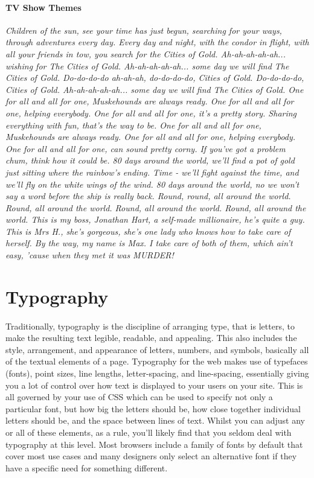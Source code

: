 \paragraph{TV Show Themes} {\emph{ Children of the sun, see your time has just begun, searching for your ways, through adventures every day. Every day and night, with the condor in flight, with all your friends in tow, you search for the Cities of Gold. Ah-ah-ah-ah-ah... wishing for The Cities of Gold. Ah-ah-ah-ah-ah... some day we will find The Cities of Gold. Do-do-do-do ah-ah-ah, do-do-do-do, Cities of Gold. Do-do-do-do, Cities of Gold. Ah-ah-ah-ah-ah... some day we will find The Cities of Gold. One for all and all for one, Muskehounds are always ready. One for all and all for one, helping everybody. One for all and all for one, it's a pretty story. Sharing everything with fun, that's the way to be. One for all and all for one, Muskehounds are always ready. One for all and all for one, helping everybody. One for all and all for one, can sound pretty corny. If you've got a problem chum, think how it could be. 80 days around the world, we'll find a pot of gold just sitting where the rainbow's ending. Time - we'll fight against the time, and we'll fly on the white wings of the wind. 80 days around the world, no we won't say a word before the ship is really back. Round, round, all around the world. Round, all around the world. Round, all around the world. Round, all around the world. This is my boss, Jonathan Hart, a self-made millionaire, he's quite a guy. This is Mrs H., she's gorgeous, she's one lady who knows how to take care of herself. By the way, my name is Max. I take care of both of them, which ain't easy, 'cause when they met it was MURDER!}}



\section{Typography}
\paragraph{} Traditionally, typography is the discipline of arranging type, that is letters, to make the resulting text legible, readable, and appealing. This also includes the style, arrangement, and appearance of letters, numbers, and symbols, basically all of the textual elements of a page. Typography for the web makes use of typefaces (fonts), point sizes, line lengths, letter-spacing, and line-spacing, essentially giving you a lot of control over how text is displayed to your users on your site. This is all governed by your use of CSS which can be used to specify not only a particular font, but how big the letters should be, how close together individual letters should be, and the space between lines of text. Whilst you can adjust any or all of these elements, as a rule, you'll likely find that you seldom deal with typography at this level. Most browsers include a family of fonts by default that cover most use cases and many designers only select an alternative font if they have a specific need for something different.
